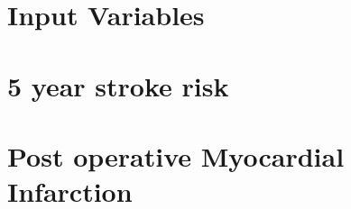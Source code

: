 \documentclass[
]{book}
\begin{document}
\hypertarget{input-variables-2}{%
\section{Input Variables}\label{input-variables-2}}

\hypertarget{year-stroke-risk}{%
\section{5 year stroke risk}\label{year-stroke-risk}}

\hypertarget{post-operative-myocardial-infarction-1}{%
\section{Post operative Myocardial Infarction}\label{post-operative-myocardial-infarction-1}}

  
\end{document}
